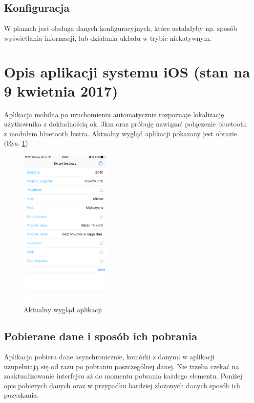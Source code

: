 \documentclass[a4paper,11pt]{article}
\begin{document}
\subsection{Konfiguracja}
W planach jest obsługa danych konfiguracyjnych, które ustalałyby np. sposób wyświetlania informacji, lub działania układu w trybie niekatywnym.

\section{Opis aplikacji systemu iOS (stan na 9 kwietnia 2017)}

Aplikacja mobilna po uruchomieniu automatycznie rozpoznaje lokalizację użytkownika z dokładnością ok. 3km oraz próbuję nawiązać połączenie bluetooth z modułem bluetooth lustra. Aktualny wygląd aplikacji pokazany jest obrazie (Rys. \ref{ios_main_screen})

\begin{figure}[H]
	\includegraphics[width=0.4\textwidth,center]{ios_main_scrren.png}
	\caption {Aktualny wygląd aplikacji}
	\label{ios_main_screen}
\end{figure}

\subsection{Pobierane dane i sposób ich pobrania}
Aplikacja pobiera dane asynchronicznie, komórki z danymi w aplikacji uzupełniają się od razu po pobraniu poszczególnej danej. Nie trzeba czekać na zaaktualizowanie interfejsu aż do momentu pobrania każdego elementu. Poniżej opis pobierych danych oraz w przypadku bardziej złożonych danych sposób ich pozyskania.
\end{document}
